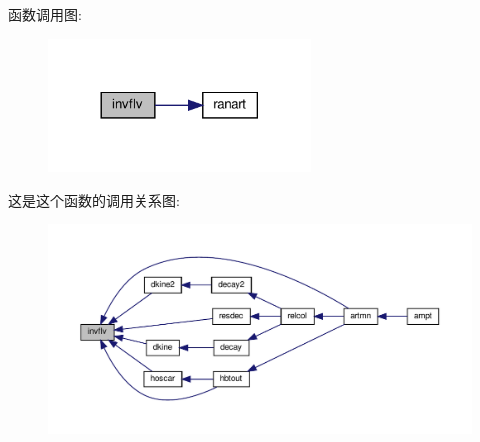 函数调用图\+:
\nopagebreak
\begin{figure}[H]
\begin{center}
\leavevmode
\includegraphics[width=197pt]{invflv_8f90_a068b3f09648c1581f3ab054c2ca7fef0_cgraph}
\end{center}
\end{figure}
这是这个函数的调用关系图\+:
\nopagebreak
\begin{figure}[H]
\begin{center}
\leavevmode
\includegraphics[width=350pt]{invflv_8f90_a068b3f09648c1581f3ab054c2ca7fef0_icgraph}
\end{center}
\end{figure}
